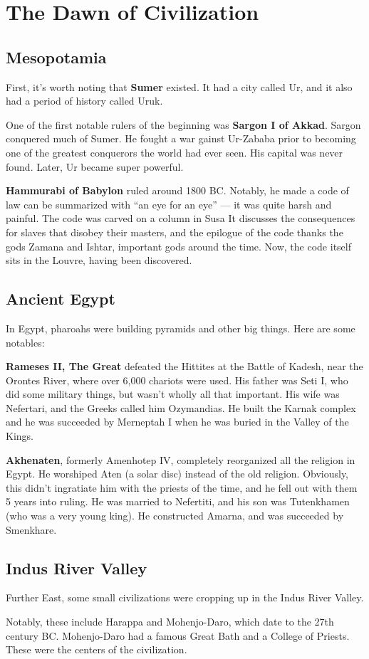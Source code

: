 \chapter{The Dawn of Civilization}

\section{Mesopotamia}

First, it's worth noting that \textbf{Sumer} existed.
It had a city called Ur, and it also had a period of history called Uruk.

One of the first notable rulers of the beginning was \textbf{Sargon I of Akkad}.
Sargon conquered much of Sumer.
He fought a war gainst Ur-Zababa prior to becoming one of the greatest conquerors the world had ever seen.
His capital was never found.
Later, Ur became super powerful.

\textbf{Hammurabi of Babylon} ruled around 1800 BC\@.
Notably, he made a code of law can be summarized with ``an eye for an eye'' --- it was quite harsh and painful.
The code was carved on a column in Susa
It discusses the consequences for slaves that disobey their masters,
and the epilogue of the code thanks the gods Zamana and Ishtar, important gods around the time.
Now, the code itself sits in the Louvre, having been discovered.

\section{Ancient Egypt}

In Egypt, pharoahs were building pyramids and other big things. Here are some notables:

\textbf{Rameses II, The Great} defeated the Hittites at the Battle of Kadesh, near the Orontes River,
where over 6,000 chariots were used.
His father was Seti I, who did some military things, but wasn't wholly all that important.
His wife was Nefertari, and the Greeks called him Ozymandias.
He built the Karnak complex and he was succeeded by Merneptah I when he was buried in the Valley of the Kings.

\textbf{Akhenaten}, formerly Amenhotep IV, completely reorganized all the religion in Egypt.
He worshiped Aten (a solar disc) instead of the old religion.
Obviously, this didn't ingratiate him with the priests of the time, and he fell out with them 5 years into ruling.
He was married to Nefertiti, and his son was Tutenkhamen (who was a very young king).
He constructed Amarna, and was succeeded by Smenkhare.

\section{Indus River Valley}

Further East, some small civilizations were cropping up in the Indus River Valley.

Notably, these include Harappa and Mohenjo-Daro, which date to the 27th century BC\@.
Mohenjo-Daro had a famous Great Bath and a College of Priests.
These were the centers of the civilization.
